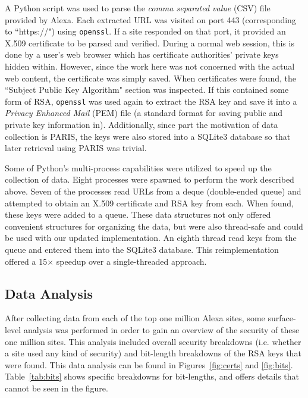 \documentclass[smallextended]{svjour3}       %
\begin{document}
A Python script was used to parse the \textit{comma separated value} (CSV) file
provided by Alexa. Each extracted URL was visited on port 443 (corresponding to
``https://") using \texttt{openssl}. If a site responded on that port, it
provided an X.509 certificate to be parsed and verified. During a normal web
session, this is done by a user's web browser which has certificate
authorities' private keys hidden within. However, since the work here was not
concerned with the actual web content, the certificate was simply saved. When
certificates were found, the ``Subject Public Key Algorithm" section was
inspected. If this contained some form of RSA, \texttt{openssl} was used again
to extract the RSA key and save it into a \textit{Privacy Enhanced Mail} (PEM)
file (a standard format for saving public and private key information in).
Additionally, since part the motivation of data collection is PARIS, the keys
were also stored into a SQLite3 database so that later retrieval using PARIS
was trivial.  

Some of Python's
multi-process capabilities were utilized to speed up the collection of data.
Eight processes were spawned to perform the work described above. Seven of the
processes read URLs from a deque (double-ended queue) and attempted to obtain
an X.509 certificate and RSA key from each. When found, these keys were added
to a queue. These data structures not only offered convenient structures for
organizing the data, but were also thread-safe and could be used with our
updated implementation. An eighth thread read keys from the queue and entered
them into the SQLite3 database. This reimplementation offered a 15$\times$
speedup over a single-threaded approach.

\subsection{Data Analysis}
\label{subsec:dataanalysis}
After collecting data from each of the top one million Alexa sites, some
surface-level analysis was performed in order to gain an overview of the
security of these one million sites. This analysis included overall security
breakdowns (i.e. whether a site used any kind of security) and
bit-length breakdowns of the RSA keys that were found. This data analysis can
be found in Figures~\ref{fig:certs} and \ref{fig:bits}. Table~\ref{tab:bits}
shows specific breakdowns for bit-lengths, and offers details that cannot be
seen in the figure.
\end{document}

